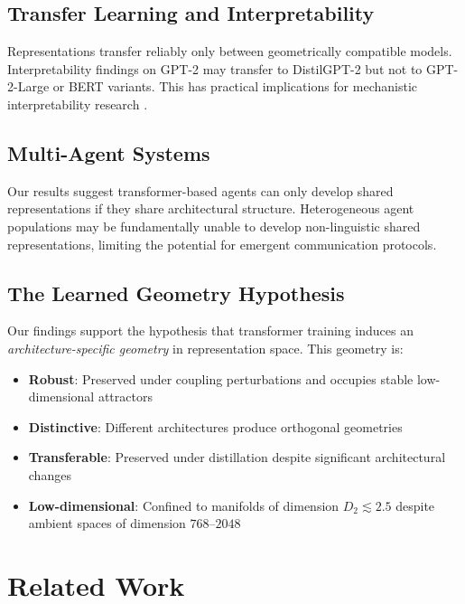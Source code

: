 \documentclass[10pt]{article} %
\theoremstyle{plain}
\theoremstyle{definition}
\theoremstyle{remark}
\begin{document}
\subsection{Transfer Learning and Interpretability}

Representations transfer reliably only between geometrically compatible models. Interpretability findings on GPT-2 may transfer to DistilGPT-2 but not to GPT-2-Large or BERT variants. This has practical implications for mechanistic interpretability research \citep{elhage2021mathematical}.

\subsection{Multi-Agent Systems}

Our results suggest transformer-based agents can only develop shared representations if they share architectural structure. Heterogeneous agent populations may be fundamentally unable to develop non-linguistic shared representations, limiting the potential for emergent communication protocols.

\subsection{The Learned Geometry Hypothesis}

Our findings support the hypothesis that transformer training induces an \textit{architecture-specific geometry} in representation space. This geometry is:
\begin{itemize}
    \item \textbf{Robust}: Preserved under coupling perturbations and occupies stable low-dimensional attractors
    \item \textbf{Distinctive}: Different architectures produce orthogonal geometries
    \item \textbf{Transferable}: Preserved under distillation despite significant architectural changes
    \item \textbf{Low-dimensional}: Confined to manifolds of dimension $D_2 \lesssim 2.5$ despite ambient spaces of dimension $768$--$2048$
\end{itemize}




\section{Related Work}
\end{document}

